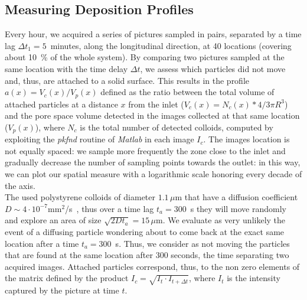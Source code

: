 \documentclass[singlecolumn,pre,notitlepage,preprintnumbers,floatfix,superscriptaddress]{revtex4-1}
\begin{document}
\subsection*{Measuring Deposition Profiles} 
\noindent
Every hour, we acquired a series of pictures sampled in pairs, separated by a time lag $\Delta t_1 = 5$~minutes, along the longitudinal direction, at 40 locations (covering about 10~\% of the whole system). By comparing two pictures sampled at the same location with the time delay $\Delta t$, we assess which particles did not move and, thus, are attached to a solid surface. This results in the profile $a(x) = V_c(x) / V_p(x)$ defined as the ratio between the total volume of attached particles at a distance $x$ from the inlet ($V_c(x) = N_c(x)*4/3\pi R^3$) and the pore space volume detected in the images collected at that same location ($V_p(x)$), where $N_c$ is the total number of detected colloids, computed by exploiting the \emph{pkfnd} routine of \emph{Matlab} in each image $I_c$. The images location is not equally spaced: we sample more frequently the zone close to the inlet and gradually decrease the number of sampling points towards the outlet: in this way, we can plot our spatial measure with a logarithmic scale honoring every decade of the axis. \\ 

\noindent
The used polystyrene colloids of diameter $1.1 \, \mu$m that have a diffusion coefficient $D \sim 4 \cdot 10^{-7}$mm$^2$/s~\cite{bordoloi_structure_2022,hamada_method_2023}, thus over a time lag $t_a = 300$~s they will move randomly and explore an area of size $\sqrt{2Dt_a} = 15 \, \mu$m. We evaluate as very unlikely the event of a diffusing particle wondering about to come back at the exact same location after a time $t_a = 300$~s. Thus, we consider as not moving the particles that are found at the same location after 300 seconds, the time separating two acquired images. Attached particles correspond, thus, to the non zero elements of the matrix defined by the product $I_c = \sqrt{I_t \cdot I_{t+\Delta t}}$, where $I_t$ is the intensity captured by the picture at time $t$.\\
\end{document}
